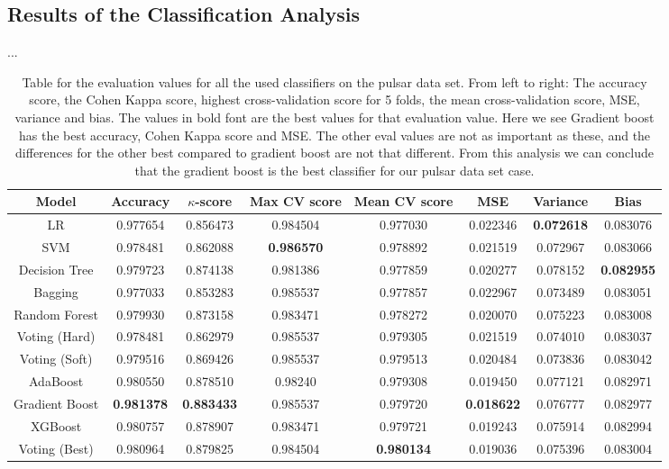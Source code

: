 \documentclass[12pt,a4paper,english]{article}
\begin{document}
\subsection{Results of the Classification Analysis}
\label{subsect:Res_class}
...
\begin{table}[htbp!]
	\hspace{-1.5cm}
	\begin{tabular}{ |c|c|c|c|c|c|c|c| }
		\hline \rule{0pt}{13pt}
		Model & Accuracy & $\kappa$-score & Max CV score & Mean CV score & MSE & Variance & Bias \\
		\hline \rule{0pt}{13pt}
		LR & 0.977654 & 0.856473 & 0.984504 & 0.977030 & 0.022346 & \textbf{0.072618} & 0.083076 \\
		\hline \rule{0pt}{13pt}
		SVM & 0.978481 & 0.862088 & \textbf{0.986570} & 0.978892 & 0.021519 & 0.072967 & 0.083066 \\
		\hline \rule{0pt}{13pt}
		Decision Tree & 0.979723 & 0.874138 & 0.981386 & 0.977859 & 0.020277 & 0.078152 & \textbf{0.082955} \\
		\hline \rule{0pt}{13pt}
		Bagging & 0.977033 & 0.853283 & 0.985537 & 0.977857 & 0.022967 & 0.073489 & 0.083051 \\
		\hline \rule{0pt}{13pt}
		Random Forest & 0.979930 & 0.873158 & 0.983471 & 0.978272 & 0.020070 & 0.075223 & 0.083008 \\
		\hline \rule{0pt}{13pt}
		Voting (Hard) & 0.978481 & 0.862979 & 0.985537 & 0.979305 & 0.021519 & 0.074010 & 0.083037 \\
		\hline \rule{0pt}{13pt}
		Voting (Soft) & 0.979516 & 0.869426 & 0.985537 & 0.979513 & 0.020484 & 0.073836 & 0.083042 \\
		\hline \rule{0pt}{13pt}
		AdaBoost & 0.980550 & 0.878510 & 0.98240 & 0.979308 & 0.019450 & 0.077121 & 0.082971 \\
		\hline \rule{0pt}{13pt}
		Gradient Boost & \textbf{0.981378} & \textbf{0.883433} & 0.985537 & 0.979720 & \textbf{0.018622} & 0.076777 & 0.082977 \\
		\hline \rule{0pt}{13pt}
		XGBoost & 0.980757 & 0.878907 & 0.983471 & 0.979721 & 0.019243 & 0.075914 & 0.082994 \\
		\hline \rule{0pt}{13pt}
		Voting (Best) & 0.980964 & 0.879825 & 0.984504 & \textbf{0.980134} & 0.019036 & 0.075396 & 0.083004 \\
		\hline
	\end{tabular}	
	\caption{Table for the evaluation values for all the used classifiers on the pulsar data set. From left to right: The accuracy score, the Cohen Kappa score, highest cross-validation score for 5 folds, the mean cross-validation score, MSE, variance and bias. The values in bold font are the best values for that evaluation value. Here we see Gradient boost has the best accuracy, Cohen Kappa score and MSE. The other eval values are not as important as these, and the differences for the other best compared to gradient boost are not that different. From this analysis we can conclude that the gradient boost is the best classifier for our pulsar data set case. \label{tab:classifiers}}
\end{table}
\end{document}
